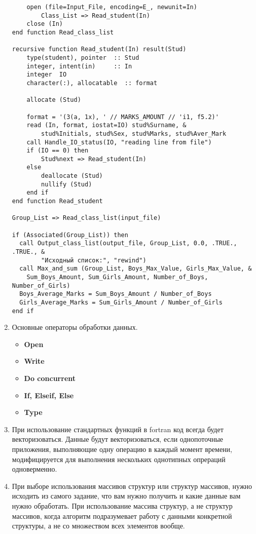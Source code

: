 \documentclass[a4paper,12pt]{extreport}
\begin{document}
\begin{enumerate}
\begin{verbatim}
    open (file=Input_File, encoding=E_, newunit=In)
        Class_List => Read_student(In)        
    close (In)
end function Read_class_list

recursive function Read_student(In) result(Stud)
    type(student), pointer  :: Stud
    integer, intent(in)     :: In
    integer  IO
    character(:), allocatable  :: format

    allocate (Stud)
    
    format = '(3(a, 1x), ' // MARKS_AMOUNT // 'i1, f5.2)'
    read (In, format, iostat=IO) stud%Surname, &
        stud%Initials, stud%Sex, stud%Marks, stud%Aver_Mark
    call Handle_IO_status(IO, "reading line from file")
    if (IO == 0) then
        Stud%next => Read_student(In)
    else
        deallocate (Stud)
        nullify (Stud)
    end if
end function Read_student

Group_List => Read_class_list(input_file)

if (Associated(Group_List)) then
  call Output_class_list(output_file, Group_List, 0.0, .TRUE., .TRUE., &
        "Исходный список:", "rewind")
  call Max_and_sum (Group_List, Boys_Max_Value, Girls_Max_Value, &
    Sum_Boys_Amount, Sum_Girls_Amount, Number_of_Boys, Number_of_Girls)
  Boys_Average_Marks = Sum_Boys_Amount / Number_of_Boys
  Girls_Average_Marks = Sum_Girls_Amount / Number_of_Girls
end if
\end{verbatim}

\item Основные операторы обработки данных.
    \begin{itemize}
         \item {\textbf{Open}}
        \item {\textbf{Write}}
        \item {\textbf{Do concurrent}}
        \item {\textbf{If, Elseif, Else}}
        \item {\textbf{Type}}
    \end{itemize}
\item При использование стандартных функций в fortran код всегда будет векторизоваться.  Данные будут векторизоваться, если однопоточные приложения, выполняющие одну операцию в каждый момент времени, модифицируется для выполнения нескольких однотипных опрераций одноверменно. 

\item При выборе использования массивов структур или структур массивов, нужно исходить из самого задание, что вам нужно получить и какие данные вам нужно обработать. При использование массива структур, а не структур массивов, когда алгоритм подразумевает работу с данными конкретной структуры, а не со множеством всех элементов вообще. 


\end{enumerate}
\end{document}

